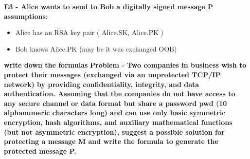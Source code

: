 \textbf{E3 - Alice wants to send to Bob a digitally signed message P}
\textbf{assumptions:}
\begin{itemize}
	\item Alice has an RSA key pair ( Alice.SK, Alice.PK )
	\item Bob knows Alice.PK (may be it was exchanged OOB)
\end{itemize}
\textbf{write down the formulas}
\textbf{Problem - Two companies in business wish to protect their messages
	(exchanged via an unprotected TCP/IP network) by
	providing confidentiality, integrity, and data authentication.
	Assuming that the companies do not have access to any
	secure channel or data format but share a password pwd
	(10 alphanumeric characters long) and can use only basic
	symmetric encryption, hash algorithms, and auxiliary
	mathematical functions (but not asymmetric encryption),
	suggest a possible solution for protecting a message M and
	write the formula to generate the protected message P.\\}

